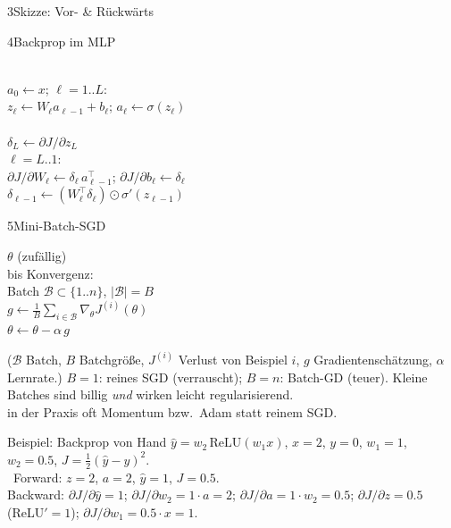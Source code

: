 \begin{hngrid}
\begin{hnp}[raster multicolumn=2,acc=hnteal]{3}{Skizze: Vor- \& Rückwärts}
\begin{tikzpicture}[scale=1.35,>=Stealth,every node/.style={draw=hnnavy,fill=hnblue!50,rounded corners=1pt,font=\tiny,inner sep=2.5pt}]
\end{tikzpicture}
\end{hnp}
%
\begin{hnp}[raster multicolumn=3,acc=hnnavy]{4}{Backprop im MLP}
\begin{pcode}[Backpropagation]
\\
$a_0\leftarrow x$;\;  $\ell=1..L$:\\
\hii $z_\ell\leftarrow W_\ell a_{\ell-1}+b_\ell$;\; $a_\ell\leftarrow\sigma(z_\ell)$\\
\\
$\delta_L\leftarrow\partial J/\partial z_L$\\
 $\ell=L..1$:\\
\hii $\partial J/\partial W_\ell\leftarrow\delta_\ell\,a_{\ell-1}^{\top}$;\; $\partial J/\partial b_\ell\leftarrow\delta_\ell$\\
\hii $\delta_{\ell-1}\leftarrow(W_\ell^{\top}\delta_\ell)\odot\sigma'(z_{\ell-1})$
\end{pcode}
\end{hnp}
%
\begin{hnp}[raster multicolumn=3,acc=hngreen]{5}{Mini-Batch-SGD}
\begin{pcode}
 $\theta$ (zufällig)\\
 bis Konvergenz:\\
\hii Batch $\mathcal B\subset\{1..n\}$, $|\mathcal B|=B$\\
\hii $g\leftarrow\frac1B\sum_{i\in\mathcal B}\nabla_\theta J^{(i)}(\theta)$\\
\hii $\theta\leftarrow\theta-\alpha\,g$
\end{pcode}
($\mathcal B$ Batch, $B$ Batchgröße, $J^{(i)}$ Verlust von Beispiel $i$, $g$ Gradientenschätzung, $\alpha$ Lernrate.) $B=1$: reines SGD (verrauscht); $B=n$: Batch-GD (teuer). Kleine Batches sind billig \emph{und} wirken leicht regularisierend.\\
 in der Praxis oft Momentum bzw.\ Adam statt reinem SGD.
\end{hnp}
%
\begin{hnex}[raster multicolumn=3]{Beispiel: Backprop von Hand}
$\hat y=w_2\,\mathrm{ReLU}(w_1x)$, $x=2$, $y=0$, $w_1=1$, $w_2=0.5$, $J=\frac12(\hat y-y)^2$.\\
\hnsol\ Forward: $z=2$, $a=2$, $\hat y=1$, $J=0.5$.\\
Backward: $\partial J/\partial\hat y=1$; $\partial J/\partial w_2=1\cdot a=2$; $\partial J/\partial a=1\cdot w_2=0.5$; $\partial J/\partial z=0.5$ (ReLU$'{=}1$); $\partial J/\partial w_1=0.5\cdot x=1$.\\

\end{hnex}
\end{hngrid}
